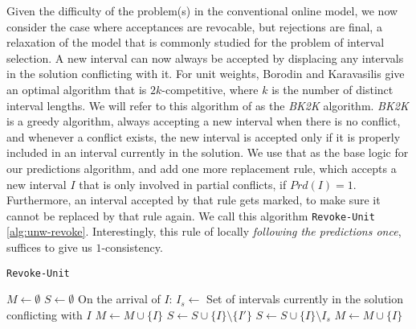 Given the difficulty of the problem(s) in the conventional online model, we now consider the case where acceptances are revocable, but rejections are final, a relaxation of the model that is commonly studied for the problem of interval selection. A new interval can now always be accepted by displacing any intervals in the solution conflicting with it. For unit weights, Borodin and Karavasilis \cite{borodin2023any} give an optimal algorithm that is $2k$-competitive, where $k$ is the number of distinct interval lengths. We will refer to this algorithm of \cite{borodin2023any} as the \textit{BK2K} algorithm. \textit{BK2K} is a greedy algorithm, always accepting a new interval when there is no conflict, and whenever a conflict exists, the new interval is accepted only if it is properly included in an interval currently in the solution. We use that as the base logic for our predictions algorithm, and add one more replacement rule, which accepts a new interval $I$ that is only involved in partial conflicts, if $Prd(I) = 1$. Furthermore, an interval accepted by that rule gets marked, to make sure it cannot be replaced by that rule again. We call this algorithm \texttt{Revoke-Unit} \ref{alg:unw-revoke}. Interestingly, this rule of locally \textit{following the predictions once}, suffices to give us $1$-consistency.




\begin{algorithm}
\caption{\texttt{Revoke-Unit}}\label{alg:unw-revoke}
\begin{algorithmic}
\State $M \gets \emptyset$ 
\State $S \gets \emptyset$ 
\State On the arrival of $I$:
\State $I_{s} \gets $ Set of intervals currently in the solution conflicting with $I$
        \State $M \gets M \cup \{I\}$
    \EndIf
    \State $S \gets S \cup \{I\} \setminus \{I'\} $
    \State $S \gets S \cup \{I\} \setminus I_s $
    \State $M \gets M \cup \{I\}$
\EndIf
\end{algorithmic}
\end{algorithm}

